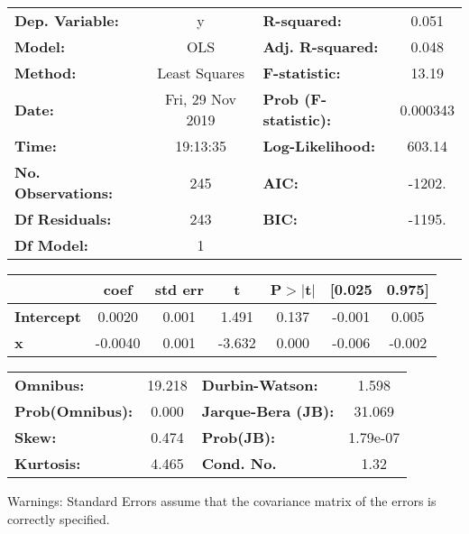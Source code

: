 \documentclass{report}
\begin{document}
\begin{center}
\begin{tabular}{lclc}
\toprule
\textbf{Dep. Variable:}    &        y         & \textbf{  R-squared:         } &     0.051   \\
\textbf{Model:}            &       OLS        & \textbf{  Adj. R-squared:    } &     0.048   \\
\textbf{Method:}           &  Least Squares   & \textbf{  F-statistic:       } &     13.19   \\
\textbf{Date:}             & Fri, 29 Nov 2019 & \textbf{  Prob (F-statistic):} &  0.000343   \\
\textbf{Time:}             &     19:13:35     & \textbf{  Log-Likelihood:    } &    603.14   \\
\textbf{No. Observations:} &         245      & \textbf{  AIC:               } &    -1202.   \\
\textbf{Df Residuals:}     &         243      & \textbf{  BIC:               } &    -1195.   \\
\textbf{Df Model:}         &           1      & \textbf{                     } &             \\
\bottomrule
\end{tabular}
\begin{tabular}{lcccccc}
                   & \textbf{coef} & \textbf{std err} & \textbf{t} & \textbf{P$>$$|$t$|$} & \textbf{[0.025} & \textbf{0.975]}  \\
\midrule
\textbf{Intercept} &       0.0020  &        0.001     &     1.491  &         0.137        &       -0.001    &        0.005     \\
\textbf{x}         &      -0.0040  &        0.001     &    -3.632  &         0.000        &       -0.006    &       -0.002     \\
\bottomrule
\end{tabular}
\begin{tabular}{lclc}
\textbf{Omnibus:}       & 19.218 & \textbf{  Durbin-Watson:     } &    1.598  \\
\textbf{Prob(Omnibus):} &  0.000 & \textbf{  Jarque-Bera (JB):  } &   31.069  \\
\textbf{Skew:}          &  0.474 & \textbf{  Prob(JB):          } & 1.79e-07  \\
\textbf{Kurtosis:}      &  4.465 & \textbf{  Cond. No.          } &     1.32  \\
\bottomrule
\end{tabular}
\end{center}

Warnings: \newline
 [1] Standard Errors assume that the covariance matrix of the errors is correctly specified.
\end{document}
